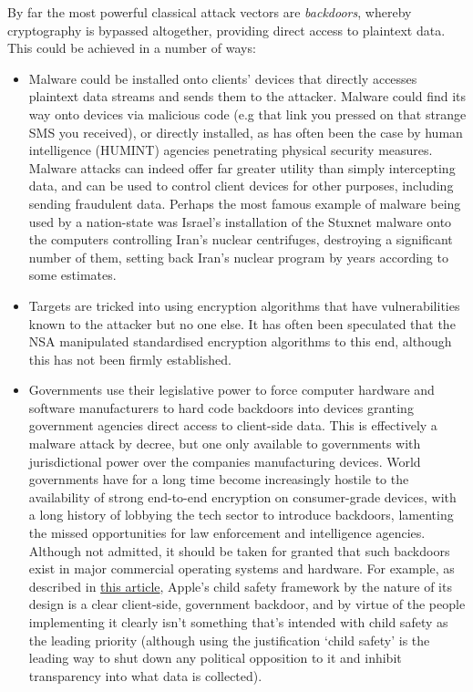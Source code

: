 By far the most powerful classical attack vectors are \emph{backdoors}, whereby cryptography is bypassed altogether, providing direct access to plaintext data. This could be achieved in a number of ways:
\begin{itemize}
	\item Malware could be installed onto clients' devices that directly accesses plaintext data streams and sends them to the attacker. Malware could find its way onto devices via malicious code (e.g that link you pressed on that strange SMS you received), or directly installed, as has often been the case by human intelligence (HUMINT) agencies penetrating physical security measures. Malware attacks can indeed offer far greater utility than simply intercepting data, and can be used to control client devices for other purposes, including sending fraudulent data. Perhaps the most famous example of malware being used by a nation-state was Israel's installation of the Stuxnet malware onto the computers controlling Iran's nuclear centrifuges, destroying a significant number of them, setting back Iran's nuclear program by years according to some estimates.
	\item Targets are tricked into using encryption algorithms that have vulnerabilities known to the attacker but no one else. It has often been speculated that the NSA manipulated standardised encryption algorithms to this end, although this has not been firmly established.
	\item Governments use their legislative power to force computer hardware and software manufacturers to hard code backdoors into devices granting government agencies direct access to client-side data. This is effectively a malware attack by decree, but one only available to governments with jurisdictional power over the companies manufacturing devices. World governments have for a long time become increasingly hostile to the availability of strong end-to-end encryption on consumer-grade devices, with a long history of lobbying the tech sector to introduce backdoors, lamenting the missed opportunities for law enforcement and intelligence agencies. Although not admitted, it should be taken for granted that such backdoors exist in major commercial operating systems and hardware. For example, as described in \href{https://peterrohde.org/apples-child-protection-software-is-not-about-child-safety-its-a-government-backdoor/}{this article}, Apple's child safety framework by the nature of its design is a clear client-side, government backdoor, and by virtue of the people implementing it clearly isn't something that's intended with child safety as the leading priority (although using the justification `child safety' is the leading way to shut down any political opposition to it and inhibit transparency into what data is collected).
\end{itemize}

